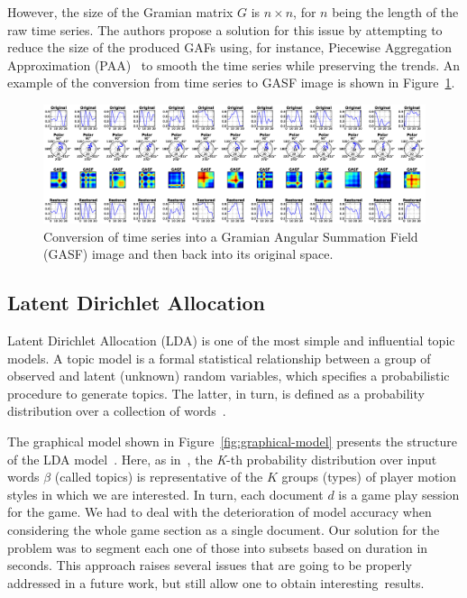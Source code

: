 However, the size of the Gramian matrix $G$ is $n \times n$, for $n$ being the length of the raw time series. The authors propose a solution for this issue by attempting to reduce the size of the produced GAFs using, for instance, Piecewise Aggregation Approximation (PAA)~\cite{keogh_scaling_2000} to smooth the time series while preserving the trends. An example of the conversion from time series to GASF image is shown in Figure~\ref{figure:gasf_example}.

\begin{figure} [H]
\centering
\includegraphics[width=.88\textwidth]{images/05-modeling/gasfpipeline.eps} 
 \caption{Conversion of time series into a Gramian Angular Summation Field (GASF) image and then back into its original space.}
 \label{figure:gasf_example}
\end{figure}

\subsection{Latent Dirichlet Allocation}
Latent Dirichlet Allocation (LDA) is one of the most simple and influential topic models. {A topic model is a formal statistical relationship between a group of observed and latent (unknown) random variables, which specifies a probabilistic procedure to generate topics. The latter, in turn, is defined as a probability distribution over a collection of words}~\cite{reed_latent_2012}.

The graphical model shown in Figure~\ref{fig:graphical-model} presents the structure of the LDA model~\cite{blei_latent_2003}. Here, as in~\cite{smith_mining_2016}, the \textit{K}-th probability distribution over input words $\beta$ (called topics) is representative of the $K$ groups (types) of player motion styles in which we are interested. In turn, each document $d$ is a {game play} session for the game. We had to deal with the deterioration of model accuracy when considering the whole game section as a single document. Our solution for the problem was to segment each one of those into subsets based on duration in seconds. This approach raises several issues that are going to be properly addressed in a future work, but still allow one to obtain interesting~results.




